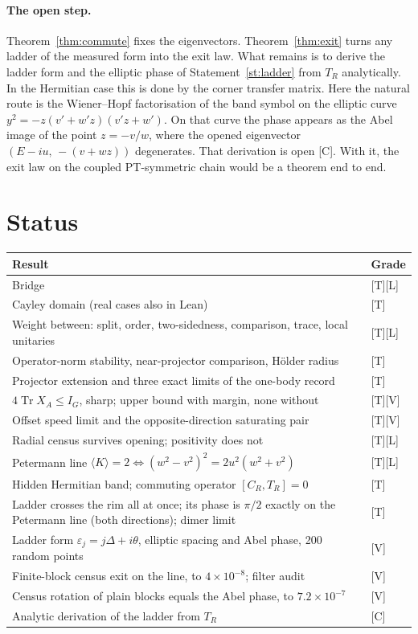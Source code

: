 \documentclass[11pt]{article}
\theoremstyle{definition}
\newcommand{\grade}[1]{\textsf{\small[#1]}}
\newcommand{\Tr}{\operatorname{Tr}}
\begin{document}
\paragraph{The open step.} Theorem~\ref{thm:commute} fixes the eigenvectors. Theorem~\ref{thm:exit} turns any ladder of the measured form into the exit law. What remains is to derive the ladder form and the elliptic phase of Statement~\ref{st:ladder} from $T_R$ analytically. In the Hermitian case this is done by the corner transfer matrix. Here the natural route is the Wiener--Hopf factorisation of the band symbol on the elliptic curve $y^2=-z(v'+w'z)(v'z+w')$. On that curve the phase appears as the Abel image of the point $z=-v/w$, where the opened eigenvector $(E-iu,\,-(v+wz))$ degenerates. That derivation is open \grade{C}. With it, the exit law on the coupled PT-symmetric chain would be a theorem end to end.

\section{Status}\label{sec:status}
\begin{center}\small
\begin{tabular}{p{}l}\toprule
Result & Grade\\\midrule
Bridge & \grade{T}\grade{L}\\
Cayley domain (real cases also in Lean) & \grade{T}\\
Weight between: split, order, two-sidedness, comparison, trace, local unitaries & \grade{T}\grade{L}\\
Operator-norm stability, near-projector comparison, Hölder radius & \grade{T}\\
Projector extension and three exact limits of the one-body record & \grade{T}\\
$4\Tr X_A\le I_G$, sharp; upper bound with margin, none without & \grade{T}\grade{V}\\
Offset speed limit and the opposite-direction saturating pair & \grade{T}\grade{V}\\
Radial census survives opening; positivity does not & \grade{T}\grade{L}\\
Petermann line $\langle K\rangle=2\iff(w^2-v^2)^2=2u^2(w^2+v^2)$ & \grade{T}\grade{L}\\
Hidden Hermitian band; commuting operator $[C_R,T_R]=0$ & \grade{T}\\
Ladder crosses the rim all at once; its phase is $\pi/2$ exactly on the Petermann line (both directions); dimer limit & \grade{T}\\
Ladder form $\varepsilon_j=j\Delta+i\theta$, elliptic spacing and Abel phase, 200 random points & \grade{V}\\
Finite-block census exit on the line, to $4\times10^{-8}$; filter audit & \grade{V}\\
Census rotation of plain blocks equals the Abel phase, to $7.2\times10^{-7}$ & \grade{V}\\
Analytic derivation of the ladder from $T_R$ & \grade{C}\\\bottomrule
\end{tabular}
\end{center}
\end{document}

